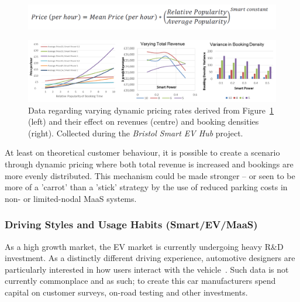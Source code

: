 \documentclass[journal]{IEEEtran}
\begin{document}
\begin{figure}[!htb]
\centering
\includegraphics[width=\columnwidth]{images/smartpricingformula.png}
\label{fig:smartpricingformula}
\end{figure}

\begin{figure}[!htb]
\centering
\includegraphics[width=\textwidth]{images/smartpricegraphs.png}
\caption{Data regarding varying dynamic pricing rates derived from Figure~\ref{fig:smartpricingformula} (left) and their effect on revenues (centre) and booking densities (right). Collected during the {\emph{Bristol Smart EV Hub}} project.}
\label{fig:smartpricegraphs}
\end{figure}


At least on theoretical customer behaviour, it is possible to create a scenario through dynamic pricing where both
total revenue is increased and bookings are more evenly
distributed. This mechanism could be made stronger -- or seen to be
more of a 'carrot' than a 'stick' strategy by the use of reduced
parking costs in non- or limited-nodal MaaS systems.

\subsubsection{Driving Styles and Usage Habits (Smart/EV/MaaS)} 

As a high growth market, the EV market is currently undergoing heavy
R\&D investment. As a distinctly different driving experience,
automotive designers are particularly interested in how users interact
with the vehicle~\cite{ferreira-et-al:2013}. Such data is not
currently commonplace and as such; to create this car manufacturers
spend capital on customer surveys, on-road testing and other
investments.
\end{document}

